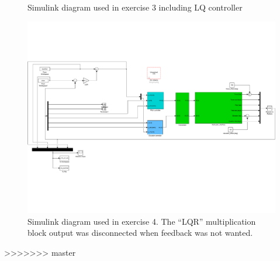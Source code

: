\begin{appendices}
\begin{figure}[h]
    \caption{Simulink diagram used in exercise 3 including LQ controller}

    \label{fig:simulink_LQ}

\end{figure}



\begin{figure}[h]

    \includegraphics[width=\textwidth]{ex4sim.pdf}

    \caption{Simulink diagram used in exercise 4. The ``LQR'' multiplication block output was disconnected when feedback was not wanted.}

\end{figure}

\end{appendices}
>>>>>>> master
